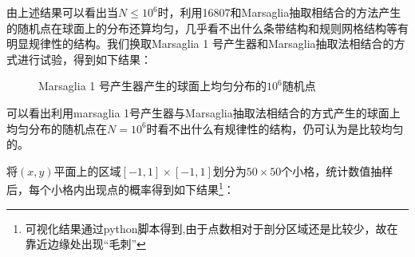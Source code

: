 \documentclass[a4paper,11pt]{article}
\begin{document}
\newpage
 由上述结果可以看出当$N\leq 10^{6}$时，利用16807和Marsaglia抽取相结合的方法产生的随机点在球面上的分布还算均匀，几乎看不出什么条带结构和规则网格结构等有明显规律性的结构。我们换取Marsaglia 1 号产生器和Marsaglia抽取法相结合的方式进行试验，得到如下结果：

\begin{figure}[!htbp]   
\centering     
{}
\caption{Marsaglia 1 号产生器产生的球面上均匀分布的$10^{6}$随机点}      
\end{figure}

\clearpage
可以看出利用marsaglia 1号产生器与Marsaglia抽取法相结合的方式产生的球面上均匀分布的随机点在$N=10^{6}$时看不出什么有规律性的结构，仍可认为是比较均匀的。

将$(x,y)$平面上的区域$[-1,1]\times [-1,1]$划分为$50\times 50$个小格，统计数值抽样后，每个小格内出现点的概率得到如下结果\footnote{可视化结果通过python脚本得到,由于点数相对于剖分区域还是比较少，故在靠近边缘处出现“毛刺”}：
\end{document}
